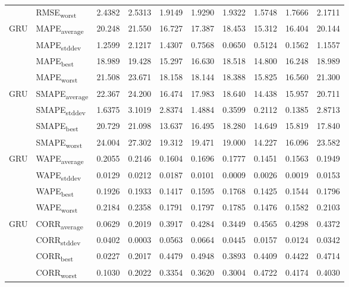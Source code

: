 {\begin{longtable}{l l c c c c c c c c}
 & RMSE\textsubscript{worst} & 2.4382 & 2.5313 & 1.9149 & 1.9290 & 1.9322 & 1.5748 & 1.7666 & 2.1711 \\
\cmidrule(lr){2-10}
\multirow{4}{*}{GRU} & MAPE\textsubscript{average} & 20.248 & 21.550 & 16.727 & 17.387 & 18.453 & 15.312 & 16.404 & 20.144 \\
 & MAPE\textsubscript{stddev} & 1.2599 & 2.1217 & 1.4307 & 0.7568 & 0.0650 & 0.5124 & 0.1562 & 1.1557 \\
 & MAPE\textsubscript{best} & 18.989 & 19.428 & 15.297 & 16.630 & 18.518 & 14.800 & 16.248 & 18.989 \\
 & MAPE\textsubscript{worst} & 21.508 & 23.671 & 18.158 & 18.144 & 18.388 & 15.825 & 16.560 & 21.300 \\
\cmidrule(lr){2-10}
\multirow{4}{*}{GRU} & SMAPE\textsubscript{average} & 22.367 & 24.200 & 16.474 & 17.983 & 18.640 & 14.438 & 15.957 & 20.711 \\
 & SMAPE\textsubscript{stddev} & 1.6375 & 3.1019 & 2.8374 & 1.4884 & 0.3599 & 0.2112 & 0.1385 & 2.8713 \\
 & SMAPE\textsubscript{best} & 20.729 & 21.098 & 13.637 & 16.495 & 18.280 & 14.649 & 15.819 & 17.840 \\
 & SMAPE\textsubscript{worst} & 24.004 & 27.302 & 19.312 & 19.471 & 19.000 & 14.227 & 16.096 & 23.582 \\
\cmidrule(lr){2-10}
\multirow{4}{*}{GRU} & WAPE\textsubscript{average} & 0.2055 & 0.2146 & 0.1604 & 0.1696 & 0.1777 & 0.1451 & 0.1563 & 0.1949 \\
 & WAPE\textsubscript{stddev} & 0.0129 & 0.0212 & 0.0187 & 0.0101 & 0.0009 & 0.0026 & 0.0019 & 0.0153 \\
 & WAPE\textsubscript{best} & 0.1926 & 0.1933 & 0.1417 & 0.1595 & 0.1768 & 0.1425 & 0.1544 & 0.1796 \\
 & WAPE\textsubscript{worst} & 0.2184 & 0.2358 & 0.1791 & 0.1797 & 0.1785 & 0.1476 & 0.1582 & 0.2103 \\
\cmidrule(lr){2-10}
\multirow{4}{*}{GRU} & CORR\textsubscript{average} & 0.0629 & 0.2019 & 0.3917 & 0.4284 & 0.3449 & 0.4565 & 0.4298 & 0.4372 \\
 & CORR\textsubscript{stddev} & 0.0402 & 0.0003 & 0.0563 & 0.0664 & 0.0445 & 0.0157 & 0.0124 & 0.0342 \\
 & CORR\textsubscript{best} & 0.0227 & 0.2017 & 0.4479 & 0.4948 & 0.3893 & 0.4409 & 0.4422 & 0.4714 \\
 & CORR\textsubscript{worst} & 0.1030 & 0.2022 & 0.3354 & 0.3620 & 0.3004 & 0.4722 & 0.4174 & 0.4030 \\

\end{longtable}}
